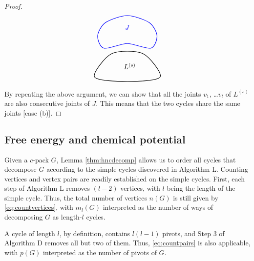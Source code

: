 \documentclass[notitlepage,preprint]{revtex4-1}
\begin{document}
\begin{proof}
\[\begin{tikzpicture}
    \draw[black, thick] plot [smooth cycle]
      coordinates{ ( 0.8*\sz, 0.6*\sz)
                   ( 3.0*\sz, 3.6*\sz)
                   ( 7.0*\sz, 3.6*\sz)
                   ( 9.2*\sz, 0.6*\sz)
                   ( 5.0*\sz, 0.0*\sz) };

    \node (L) at (5.3*\sz, 2.0*\sz) {$L^{(s)}$};

    \draw[blue, thick] plot [smooth cycle]
      coordinates{
                   ( 2.0*\sz, 4.3*\sz)
                   ( 1.2*\sz, 5.9*\sz)
                   ( 2.2*\sz, 7.6*\sz)
                   ( 5.0*\sz, 8.5*\sz)
                   ( 7.8*\sz, 7.6*\sz)
                   ( 8.8*\sz, 5.9*\sz)
                   ( 8.0*\sz, 4.3*\sz)
                   ( 5.0*\sz, 4.9*\sz) };


    \node (J) at (5.0*\sz, 7.0*\sz) [blue] {$J$};
  \end{tikzpicture}
\]

By repeating the above argument, we can show that
  all the joints $v_1$, \dots $v_l$ of $L^{(s)}$
  are also consecutive joints of $J$.
%
This means that the two cycles share the same joints
  [case (b)].
\end{proof}




\subsection*{Free energy and chemical potential}


Given a $c$-pack $G$,
  Lemma \ref{thm:hncdecomp} allows us
  to order all cycles that decompose $G$
  according to the simple cycles
  discovered in Algorithm L.
%
Counting vertices and vertex pairs
  are readily established on the simple cycles.
%
First, each step of Algorithm L removes $(l - 2)$ vertices,
  with $l$ being the length of the simple cycle.
%
Thus, the total number of vertices $n(G)$
  is still given by \eqref{eq:countvertices},
  with $m_l(G)$ interpreted as
  the number of ways
  of decomposing $G$ as length-$l$ cycles.

A cycle of length $l$, by definition,
  contains $l (l - 1)$ pivots,
  and Step 3 of Algorithm D
  removes all but two of them.
%
Thus, \eqref{eq:countpairs}
  is also applicable, with $p(G)$ interpreted
  as the number of pivots of $G$.
\end{document}
